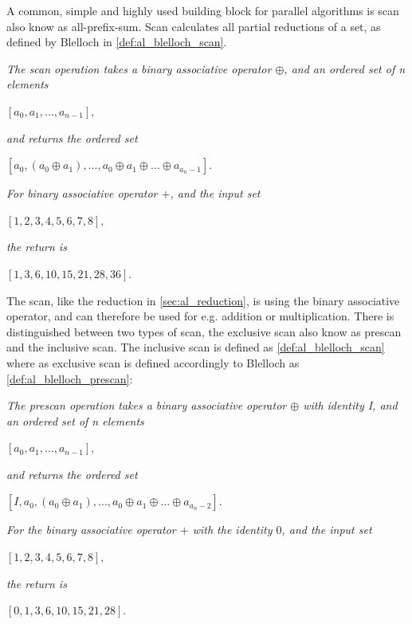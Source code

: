 A common, simple and highly used building block for parallel algorithms is scan also know as all-prefix-sum. Scan calculates all partial reductions of a set, as defined by Blelloch \cite{BlellochTR90} in \cref{def:al_blelloch_scan}.

\begin{definition}
\label{def:al_blelloch_scan}
\textit{The scan operation takes a binary associative operator $\oplus$, and an ordered set of n elements}
\begin{center}
$[a_0,a_1,...,a_{n-1}],$
\end{center}
\textit{and returns the ordered set}
\begin{center}
$[a_0, (a_0 \oplus a_1),...,{a_0 \oplus a_1 \oplus ... \oplus a_{a_n-1}}].$
\end{center}
\end{definition} 
\begin{example}
\textit{For binary associative operator $+$, and the input set}
\begin{center}
	$[1,2,3,4,5,6,7,8],$
\end{center}
\textit{the return is}
\begin{center}
	$[1,3,6,10,15,21,28,36].$
\end{center}
\end{example}

The scan, like the reduction in \cref{sec:al_reduction}, is using the binary associative operator, and can therefore be used for e.g. addition or multiplication. There is distinguished between two types of scan, the exclusive scan also know as prescan and the inclusive scan. The inclusive scan is defined as \cref{def:al_blelloch_scan} where as exclusive scan is defined accordingly to Blelloch \cite{BlellochTR90} as \cref{def:al_blelloch_prescan}:

\begin{definition}
	\label{def:al_blelloch_prescan}
	\textit{The prescan operation takes a binary associative operator $\oplus$ with identity I, and an ordered set of n elements}
	\begin{center}
		$[a_0,a_1,...,a_{n-1}],$
	\end{center}
	\textit{and returns the ordered set}
	\begin{center}
		$[I,a_0, (a_0 \oplus a_1),...,{a_0 \oplus a_1 \oplus ... \oplus a_{a_n-2}}].$
	\end{center}
\end{definition}
\begin{example}
	\textit{For the binary associative operator $+$ with the identity $0$, and the input set}
	\begin{center}
		$[1,2,3,4,5,6,7,8],$
	\end{center}
	\textit{the return is}
	\begin{center}
		$[0,1,3,6,10,15,21,28].$
	\end{center}
\end{example}

